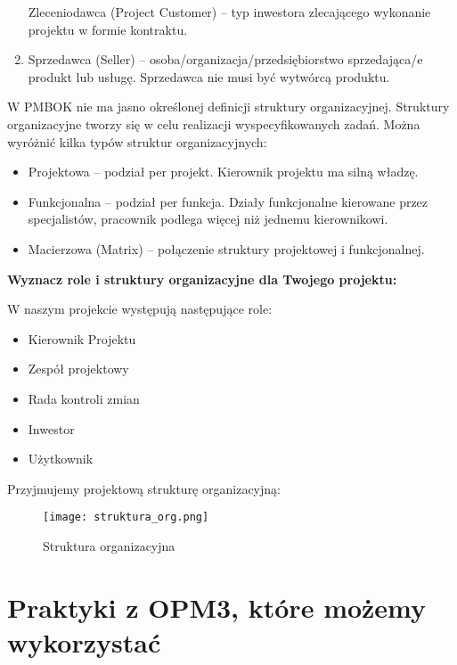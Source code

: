 \begin{enumerate}
Zleceniodawca (Project Customer) – typ inwestora zlecającego wykonanie projektu w formie kontraktu. 
\item	Sprzedawca (Seller) – osoba/organizacja/przedsiębiorstwo sprzedająca/e produkt lub usługę. Sprzedawca nie musi być wytwórcą produktu.
\end{enumerate}

W PMBOK nie ma jasno określonej definicji struktury organizacyjnej. Struktury organizacyjne tworzy się w celu realizacji wyspecyfikowanych zadań. Można wyróżnić kilka typów struktur organizacyjnych:
\begin{itemize}
\item	Projektowa – podział per projekt. Kierownik projektu ma silną władzę. 
\item	Funkcjonalna – podział per funkcja. Działy funkcjonalne kierowane przez specjalistów, pracownik podlega więcej niż jednemu kierownikowi.
\item	Macierzowa (Matrix) – połączenie struktury projektowej i funkcjonalnej.
\end{itemize}


\textbf{Wyznacz role i struktury organizacyjne dla Twojego projektu:}


W naszym projekcie występują następujące role:
\begin{itemize}
\item Kierownik Projektu
\item Zespół projektowy
\item Rada kontroli zmian
\item Inwestor
\item Użytkownik
\end{itemize}

\clearpage

Przyjmujemy projektową strukturę organizacyjną:
\begin{figure}[!ht]
\begin{center}
\texttt{[image: struktura\_org.png]}
\caption[Struktura organizacyjna]{Struktura organizacyjna}
\label{rysunekProces}
\end{center}
\end{figure}



\section{Praktyki z OPM3, które możemy wykorzystać}

